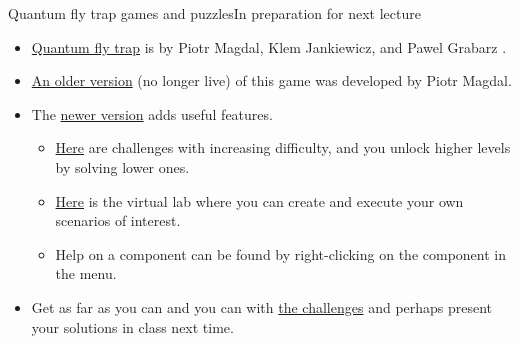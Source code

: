 \begin{frame}{Quantum fly trap games and puzzles}{In preparation for next lecture}

\begin{itemize}
    \item \href{https://quantumflytrap.com/}{Quantum fly trap} is by Piotr Magdal, Klem Jankiewicz, and Pawel Grabarz .
    \item \href{https://github.com/stared/quantum-game}{An older version} (no longer live) of this game was developed by Piotr Magdal.
    \item The \href{https://quantumflytrap.com}{newer version} adds useful features.
    \begin{itemize}
    \item \href{https://lab.quantumflytrap.com/game}{Here} are challenges with increasing difficulty, and you unlock higher levels by solving lower ones.
    \item \href{https://lab.quantumflytrap.com/lab}{Here} is the virtual lab where you can create and execute your own scenarios of interest.  
    \item Help on a component can be found by right-clicking on the component in the menu.
    \end{itemize}
    \item \alert{Get as far as you can and you can with \href{https://lab.quantumflytrap.com/game}{the challenges} and perhaps present your solutions in class next time.}
\end{itemize}
    
\end{frame}


